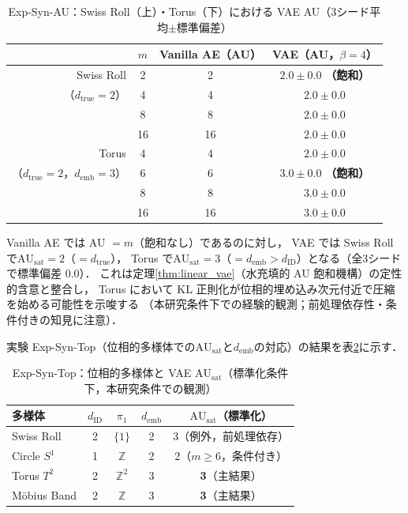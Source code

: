 \documentclass[11pt,a4paper]{jsarticle}
\newcommand{\dID}{d_{\mathrm{ID}}}
\newcommand{\dtrue}{d_{\mathrm{true}}}
\newcommand{\AUsat}{\mathrm{AU}_{\mathrm{sat}}}
\newcommand{\demb}{d_{\mathrm{emb}}}
\begin{document}
\begin{table}[H]
\centering
\caption{Exp-Syn-AU：Swiss Roll（上）・Torus（下）における VAE AU（3シード平均$\pm$標準偏差）}
\label{tab:ea_summary}
\small
\begin{tabular}{rccc}
\toprule
 & $m$ & Vanilla AE（AU） & VAE（AU，$\beta=4$） \\
\midrule
Swiss Roll & 2 & 2 & $2.0\pm0.0$ \textbf{（飽和）} \\
（$\dtrue = 2$） & 4 & 4 & $2.0\pm0.0$ \\
 & 8 & 8 & $2.0\pm0.0$ \\
 & 16 & 16 & $2.0\pm0.0$ \\
\midrule
Torus & 4 & 4 & $2.0\pm0.0$ \\
（$\dtrue = 2$，$\demb = 3$） & 6 & 6 & $3.0\pm0.0$ \textbf{（飽和）} \\
 & 8 & 8 & $3.0\pm0.0$ \\
 & 16 & 16 & $3.0\pm0.0$ \\
\bottomrule
\end{tabular}
\end{table}

Vanilla AE では AU $= m$（飽和なし）であるのに対し，
VAE では Swiss Roll で$\AUsat = 2$（$= \dtrue$），
Torus で$\AUsat = 3$（$= \demb > \dID$）となる（全3シードで標準偏差 0.0）．
これは定理\ref{thm:linear_vae}（水充填的 AU 飽和機構）の定性的含意と整合し，
Torus において KL 正則化が位相的埋め込み次元付近で圧縮を始める可能性を示唆する
（本研究条件下での経験的観測；前処理依存性・条件付きの知見に注意）．

実験 Exp-Syn-Top（位相的多様体での$\AUsat$と$\demb$の対応）の結果を表\ref{tab:eb_summary}に示す．

\begin{table}[H]
\centering
\caption{Exp-Syn-Top：位相的多様体と VAE $\AUsat$（標準化条件下，本研究条件での観測）}
\label{tab:eb_summary}
\small
\begin{tabular}{lcccc}
\toprule
多様体 & $\dID$ & $\pi_1$ & $\demb$ & $\AUsat$（標準化） \\
\midrule
Swiss Roll   & 2 & $\{1\}$        & 2 & 3（例外，前処理依存）\\
Circle $S^1$ & 1 & $\mathbb{Z}$   & 2 & 2（$m \geq 6$，条件付き）\\
Torus $T^2$  & 2 & $\mathbb{Z}^2$ & 3 & \textbf{3}（主結果）\\
Möbius Band  & 2 & $\mathbb{Z}$   & 3 & \textbf{3}（主結果）\\
\bottomrule
\end{tabular}
\end{table}
\end{document}
